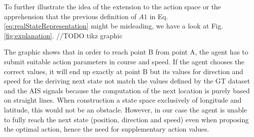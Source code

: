 To further illustrate the idea of the extension to the action space or the apprehension that the previous definition of $A1$ in Eq. \ref{eq:realStateRepresentation} might be misleading, we have a look at Fig. \ref{fig:explanation}.
//TODO tikz graphic

The graphic shows that in order to reach point B from point A, the agent has to submit suitable action parameters in course and speed. If the agent chooses the correct values, it will end up exactly at point B but its values for direction and speed for the deriving next state not match the values defined by the GT dataset and the AIS signals because the computation of the next location is purely based on straight lines. When construction a state space exclusively of longitude and latitude, this would not be an obstacle. However, in our case the agent is unable to fully reach the next state (position, direction and speed) even when proposing the optimal action, hence the need for supplementary action values.